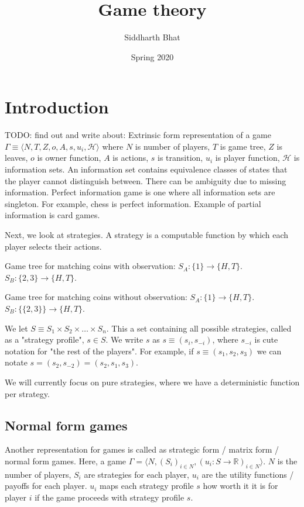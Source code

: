 \documentclass[11pt]{book}
\title{Game theory}
\author{Siddharth Bhat}
\date{Spring 2020}
\newcommand{\R}{\ensuremath{\mathbb R}}
\begin{document}
\maketitle
\tableofcontents

\chapter{Introduction}

TODO: find out and write about: 
Extrinsic form representation of a game
$\Gamma \equiv \langle N, T, Z, o, A, s, u_i, \mathcal{H}\rangle$
where $N$ is number of players, $T$ is game tree, $Z$ is leaves, $o$ is owner
function, $A$ is actions, $s$ is transition, $u_i$ is player function, $\mathcal H$
is information sets. An information set contains equivalence classes
of states that the player cannot distinguish between. There can be ambiguity
due to missing information. Perfect information game is one where all
information sets are singleton. For example, chess is perfect information.
Example of partial information is card games.

Next, we look at strategies. A strategy is a computable function by which
each player selects their actions.

Game tree for matching coins with observation:
$S_A: \{ 1 \} \rightarrow \{H, T\}$. $S_B: \{2, 3\} \rightarrow \{H, T \}$.


Game tree for matching coins without observation:
$S_A: \{ 1 \} \rightarrow \{H, T\}$. $S_B: \{\{2, 3\}\} \rightarrow \{H, T \}$.

We let $S \equiv S_1 \times S_2 \times \dots \times S_n$. This a set containing
all possible strategies, called as a "strategy profile", $s \in S$. We
write $s$ as $s \equiv (s_i, s_{-i})$, where $s_{-i}$ is cute notation for
"the rest of the players". For example, if $s \equiv (s_1, s_2, s_3)$ we can 
notate $s = (s_2, s_{-2}) = (s_2, s_1, s_3)$.

We will currently focus on pure strategies, where we have a deterministic
function per strategy.


\section{Normal form games}
Another representation for games is called as strategic form / matrix form / 
normal form games.  Here, a game $\Gamma = \langle N, (S_i)_{i \in N}, (u_i: S \rightarrow \R)_{i \in N} \rangle$.
$N$ is the number of players, $S_i$ are strategies for each player, $u_i$ 
are the utility functions / payoffs for each player. $u_i$ maps each
strategy profile $s$ how worth it it is for player $i$ if
the game proceeds with strategy profile $s$.
\end{document}

